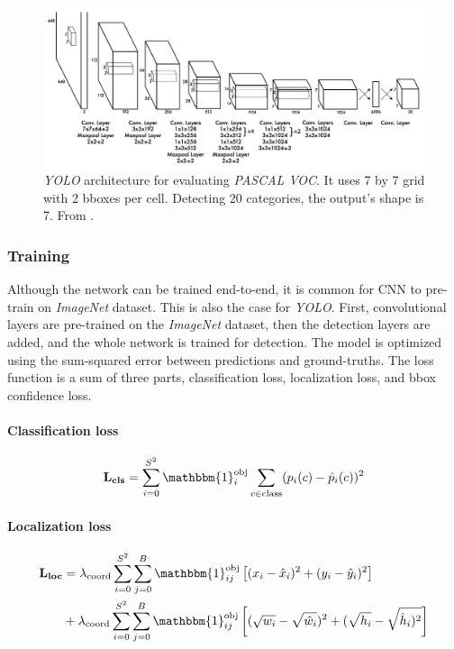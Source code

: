 \begin{figure}
    \centering
    \includegraphics[width=\textwidth]{img/yoylo}
    \caption{\textit{YOLO} architecture for evaluating \textit{PASCAL VOC}. It uses 7 by 7 grid with 2 bboxes per cell. Detecting 20 categories, the output's shape is 7. From \cite[fig. 3]{bib:yolo}.}
    \label{fig:yolo} 
\end{figure}

\subsubsection{Training}
Although the network can be trained end-to-end, it is common for CNN to pre-train on \textit{ImageNet} dataset. This is also the case for \textit{YOLO}. First, convolutional layers are pre-trained on the \textit{ImageNet} dataset, then the detection layers are added, and the whole network is trained for detection. The model is optimized using the sum-squared error between predictions and ground-truths. The loss function is a sum of three parts, classification loss, localization loss, and bbox confidence loss. 

\paragraph{Classification loss}
\begin{align*}
\mathbf{L_{cls}} = \sum_{i=0}^{S^2}\mathbbm{1}_i^{\text{obj}} \sum_{c\in \text{class}} (p_i(c) - \hat{p}_i(c))^2
\end{align*}

\paragraph{Localization loss}
\begin{align*}
\mathbf{L_{loc}} &= \lambda_{\text{coord}} \sum_{i=0}^{S^2} \sum_{j=0}^B \mathbbm{1}_{ij}^{\text{obj}} \left[(x_i - \hat{x}_i)^2 + (y_i - \hat{y}_i)^2\right] \\
 &+  \lambda_{\text{coord}} \sum_{i=0}^{S^2} \sum_{j=0}^B \mathbbm{1}_{ij}^{\text{obj}} \left[(\sqrt{w_i} - \sqrt{\hat{w}_i})^2 + (\sqrt{h_i} - \sqrt{\hat{h}_i)^2}\right]
\end{align*}

